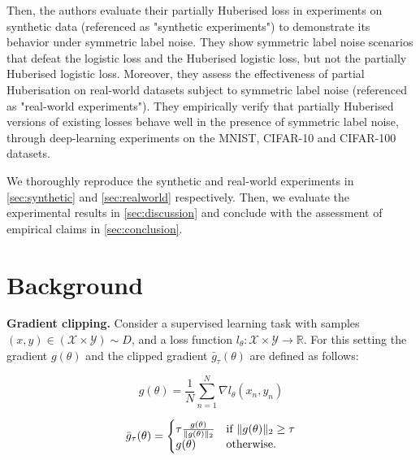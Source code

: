 \vspace{+2 mm}

Then, the authors evaluate their partially Huberised loss in experiments on synthetic data (referenced as "synthetic experiments") to demonstrate its behavior under symmetric label noise. They show symmetric label noise scenarios that defeat the logistic loss and the Huberised logistic loss, but not the partially Huberised logistic loss. Moreover, they assess the effectiveness of partial Huberisation on real-world datasets subject to symmetric label noise (referenced as "real-world experiments"). They empirically verify that partially Huberised versions of existing losses behave well in the presence of symmetric label noise, through deep-learning experiments on the MNIST, CIFAR-10 and CIFAR-100 datasets.

We thoroughly reproduce the synthetic and real-world experiments in \autoref{sec:synthetic} and \autoref{sec:realworld} respectively. Then, we evaluate the experimental results in \autoref{sec:discussion} and conclude with the assessment of empirical claims in \autoref{sec:conclusion}.

\section{Background}

\textbf{Gradient clipping.} Consider a supervised learning task with samples $(x,y) \in (\mathcal{X} \times \mathcal{Y}) \sim D$, and a loss function $l_{\theta} : \mathcal{X} \times \mathcal{Y} \rightarrow \mathbb{R}$. For this setting the gradient $g(\theta)$ and the clipped gradient $\bar{g}_{\tau}(\theta)$ are defined as follows:

\begin{minipage}{0.49\textwidth}
    \begin{center}
        \begin{equation*}
            g(\theta) = \frac{1}{N} \sum_{n=1}^N \nabla l_{\theta}(x_n, y_n)
        \end{equation*}
    \end{center}
\end{minipage}
\begin{minipage}{0.49\textwidth}
    \begin{center}
        \begin{equation*}
        \bar{g}_{\tau}(\theta) = 
        \left\{
          \begin{array}{@{}ll@{}}
            \tau \frac{g(\theta)}{\lVert g(\theta) \rVert_2} & \textrm{if }  \lVert g(\theta) \rVert_2 \geq \tau \\
            g(\theta) & \text{otherwise.}
          \end{array}\right.
        \end{equation*}
    \end{center}
\end{minipage}

